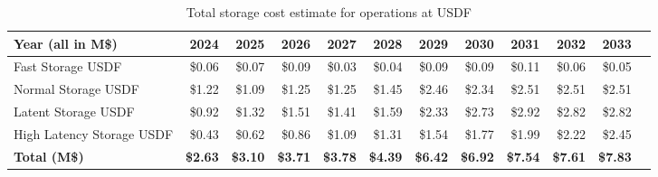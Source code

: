 \tiny \begin{longtable} { |p{}  |r  |r  |r  |r  |r  |r  |r  |r  |r  |r  |r |} 
\caption{Total storage cost estimate for operations at USDF \label{tab:opsStorageUSDF}}\\ 
\hline 
\textbf{Year (all in M\$)}&\textbf{2024}&\textbf{2025}&\textbf{2026}&\textbf{2027}&\textbf{2028}&\textbf{2029}&\textbf{2030}&\textbf{2031}&\textbf{2032}&\textbf{2033} \\ \hline
{Fast Storage USDF}&{\$0.06}&{\$0.07}&{\$0.09}&{\$0.03}&{\$0.04}&{\$0.09}&{\$0.09}&{\$0.11}&{\$0.06}&{\$0.05} \\ \hline
{Normal Storage USDF}&{\$1.22}&{\$1.09}&{\$1.25}&{\$1.25}&{\$1.45}&{\$2.46}&{\$2.34}&{\$2.51}&{\$2.51}&{\$2.51} \\ \hline
{Latent Storage USDF}&{\$0.92}&{\$1.32}&{\$1.51}&{\$1.41}&{\$1.59}&{\$2.33}&{\$2.73}&{\$2.92}&{\$2.82}&{\$2.82} \\ \hline
{High Latency Storage USDF}&{\$0.43}&{\$0.62}&{\$0.86}&{\$1.09}&{\$1.31}&{\$1.54}&{\$1.77}&{\$1.99}&{\$2.22}&{\$2.45} \\ \hline
\textbf{Total (M\$)}&\textbf{\$2.63}&\textbf{\$3.10}&\textbf{\$3.71}&\textbf{\$3.78}&\textbf{\$4.39}&\textbf{\$6.42}&\textbf{\$6.92}&\textbf{\$7.54}&\textbf{\$7.61}&\textbf{\$7.83} \\ \hline
\end{longtable} \normalsize
